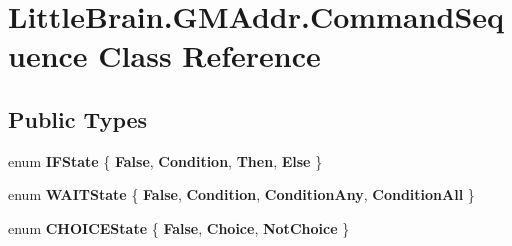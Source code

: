 \hypertarget{class_little_brain_1_1_g_m_addr_1_1_command_sequence}{}\section{Little\+Brain.\+G\+M\+Addr.\+Command\+Sequence Class Reference}
\label{class_little_brain_1_1_g_m_addr_1_1_command_sequence}
\subsection*{Public Types}
\begin{DoxyCompactItemize}
\item 
enum {\bfseries I\+F\+State} \{ {\bfseries False}, 
{\bfseries Condition}, 
{\bfseries Then}, 
{\bfseries Else}
 \}\hypertarget{class_little_brain_1_1_g_m_addr_1_1_command_sequence_a991781cddd2dfdde3a5d60a940c0afcc}{}\label{class_little_brain_1_1_g_m_addr_1_1_command_sequence_a991781cddd2dfdde3a5d60a940c0afcc}

\item 
enum {\bfseries W\+A\+I\+T\+State} \{ {\bfseries False}, 
{\bfseries Condition}, 
{\bfseries Condition\+Any}, 
{\bfseries Condition\+All}
 \}\hypertarget{class_little_brain_1_1_g_m_addr_1_1_command_sequence_abe54e393f577b11d4ba5762c2cb7be1e}{}\label{class_little_brain_1_1_g_m_addr_1_1_command_sequence_abe54e393f577b11d4ba5762c2cb7be1e}

\item 
enum {\bfseries C\+H\+O\+I\+C\+E\+State} \{ {\bfseries False}, 
{\bfseries Choice}, 
{\bfseries Not\+Choice}
 \}\hypertarget{class_little_brain_1_1_g_m_addr_1_1_command_sequence_a7ec982a74ff2cbbf1e5b46a609553f1d}{}\label{class_little_brain_1_1_g_m_addr_1_1_command_sequence_a7ec982a74ff2cbbf1e5b46a609553f1d}

\end{DoxyCompactItemize}
